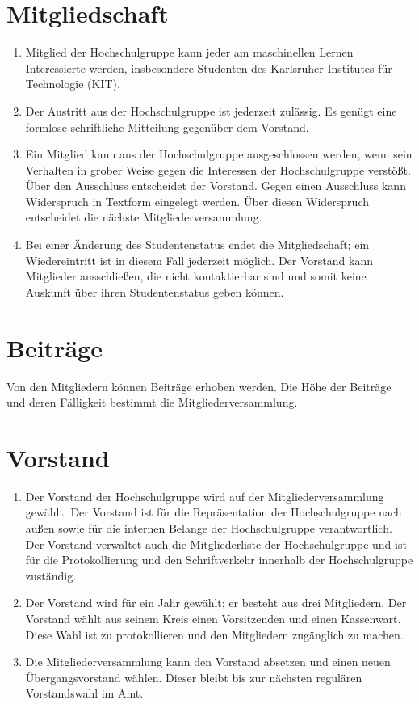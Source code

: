 \documentclass[a4paper]{scrartcl}
\begin{document}
\section{Mitgliedschaft}
\begin{enumerate}
    \item Mitglied der Hochschulgruppe kann jeder am maschinellen Lernen
          Interessierte werden, insbesondere Studenten des Karlsruher
          Institutes für Technologie (KIT).
    \item Der Austritt aus der Hochschulgruppe ist jederzeit zulässig. Es
          genügt eine formlose schriftliche Mitteilung gegenüber dem Vorstand.
    \item Ein Mitglied kann aus der Hochschulgruppe ausgeschlossen werden, wenn
          sein Verhalten in grober Weise gegen die Interessen der
          Hochschulgruppe verstößt. Über den Ausschluss entscheidet der
          Vorstand. Gegen einen Ausschluss kann Widerspruch in Textform
          eingelegt werden. Über diesen Widerspruch entscheidet die nächste
          Mitgliederversammlung.
    \item Bei einer Änderung des Studentenstatus endet die Mitgliedschaft; ein
          Wiedereintritt ist in diesem Fall jederzeit möglich. Der Vorstand
          kann Mitglieder ausschließen, die nicht kontaktierbar sind und somit
          keine Auskunft über ihren Studentenstatus geben können.

\end{enumerate}

\section{Beiträge}
Von den Mitgliedern können Beiträge erhoben werden. Die Höhe der Beiträge und
deren Fälligkeit bestimmt die Mitgliederversammlung.

\section{Vorstand}
\begin{enumerate}
    \item Der Vorstand der Hochschulgruppe wird auf der Mitgliederversammlung
          gewählt. Der Vorstand ist für die Repräsentation der Hochschulgruppe
          nach außen sowie für die internen Belange der Hochschulgruppe
          verantwortlich. Der Vorstand verwaltet auch die Mitgliederliste der
          Hochschulgruppe und ist für die Protokollierung und den
          Schriftverkehr innerhalb der Hochschulgruppe zuständig.
    \item Der Vorstand wird für ein Jahr gewählt; er besteht aus drei
          Mitgliedern. Der Vorstand wählt aus seinem Kreis einen Vorsitzenden
          und einen Kassenwart. Diese Wahl ist zu protokollieren und den
          Mitgliedern zugänglich zu machen.
    \item Die Mitgliederversammlung kann den Vorstand absetzen und einen neuen
          Übergangsvorstand wählen. Dieser bleibt bis zur nächsten regulären Vorstandswahl im Amt.
\end{enumerate}
\end{document}
